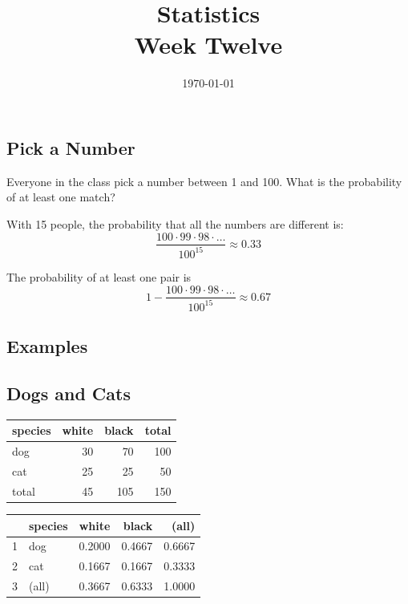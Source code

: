 \documentclass[letterpaper, landscape]{exam}
\title{Statistics \\ Week Twelve}
\date{\today}
\author{}
\begin{document}
  \maketitle
  \tableofcontents

  \subsection{Pick a Number}
  Everyone in the class pick a number between 1 and 100. What is the probability
  of at least one match?

  \begin{solution}
    With 15 people, the probability that all the numbers are different is:
    \[
      \frac{100 \cdot 99 \cdot 98 \cdot \ldots}{100^{15}} \approx 0.33
    \]

    The probability of at least one pair is
    \[
      1 - \frac{100 \cdot 99 \cdot 98 \cdot \ldots}{100^{15}} \approx \boxed{ 0.67 }
    \]
  \end{solution}

  \subsection{Examples}


  \subsection{Dogs and Cats}
  \begin{table}[H]
    \begin{tabular}[H]{lrrr}
      \toprule
      species & white & black & total\\
      \midrule
      dog     & 30    & 70    & 100\\
      cat     & 25    & 25    & 50\\
      \midrule
      total   & 45    & 105   & 150\\
      \bottomrule
    \end{tabular}
  \end{table}

  \begin{table}[H]
    \begin{tabular}{rlrrr}
      \toprule
        & species & white  & black  & (all) \\
      \midrule
      1 & dog     & 0.2000 & 0.4667 & 0.6667 \\
      2 & cat     & 0.1667 & 0.1667 & 0.3333 \\
      \midrule
      3 & (all)   & 0.3667 & 0.6333 & 1.0000 \\
      \bottomrule
    \end{tabular}
  \end{table}
\end{document}

